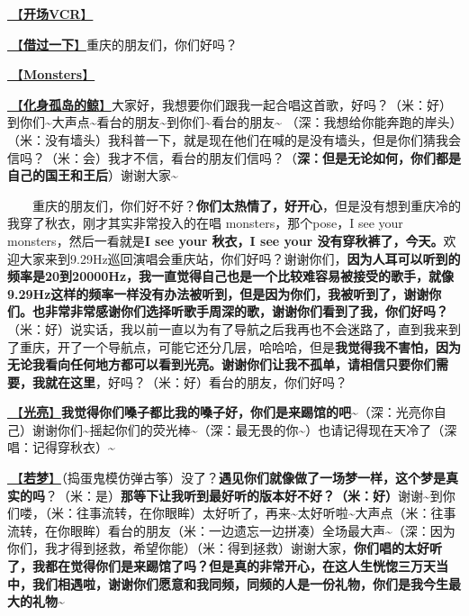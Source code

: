 \documentclass[]{ctexbook}
\begin{document}
\hyperref[opening-vcr]{🎥【\textbf{开场VCR}】}

\hyperref[I-will-go-my-way]{🎵【\textbf{借过一下}】}重庆的朋友们，你们好吗？

\hyperref[Monsters]{🎵【\textbf{Monsters}】}

\hyperref[hua-shen-gu-dao-de-jing]{🎵【\textbf{化身孤岛的鲸}】}大家好，我想要你们跟我一起合唱这首歌，好吗？（米：好）到你们\textasciitilde 大声点\textasciitilde 看台的朋友\textasciitilde 到你们\textasciitilde 看台的朋友\textasciitilde{}
（深：我想给你能奔跑的岸头）（米：没有墙头）我科普一下，就是现在他们在喊的是没有墙头，但是你们猜我会信吗？（米：会）我才不信，看台的朋友们信吗？（\textbf{深：但是无论如何，你们都是自己的国王和王后}）谢谢大家\textasciitilde{}

  重庆的朋友们，你们好不好？\textbf{你们太热情了，好开心}，但是没有想到重庆冷的我穿了秋衣，刚才其实非常投入的在唱 monsters，那个pose，I see your monsters，然后一看就是\textbf{I see your 秋衣，I see your 没有穿秋裤了，今天。}欢迎大家来到9.29Hz巡回演唱会重庆站，你们好吗？谢谢你们，\textbf{因为人耳可以听到的频率是20到20000Hz，我一直觉得自己也是一个比较难容易被接受的歌手，就像9.29Hz这样的频率一样没有办法被听到，但是因为你们，我被听到了，谢谢你们。也非常非常感谢你们选择听歌手周深的歌，谢谢你们看到了我，你们好吗？}（米：好）说实话，我以前一直以为有了导航之后我再也不会迷路了，直到我来到了重庆，开了一个导航点，可能它还分几层，哈哈哈，但是\textbf{我觉得我不害怕，因为无论我看向任何地方都可以看到光亮。谢谢你们让我不孤单，请相信只要你们需要，我就在这里}，好吗？（米：好）看台的朋友，你们好吗？

\hyperref[silver-linings]{🎵【\textbf{光亮}】}\textbf{我觉得你们嗓子都比我的嗓子好，你们是来踢馆的吧}\textasciitilde（深：光亮你自己）谢谢你们\textasciitilde 摇起你们的荧光棒\textasciitilde（深：最无畏的你\textasciitilde）也请记得现在天冷了（深唱：记得穿秋衣）\textasciitilde{}

\hyperref[ruomeng]{🎵【\textbf{若梦}】}（捣蛋鬼模仿弹古筝）没了？\textbf{遇见你们就像做了一场梦一样，这个梦是真实的吗}？（米：是）\textbf{那等下让我听到最好听的版本好不好？（米：好）}谢谢\textasciitilde 到你们喽，（米：往事流转，在你眼眸）太好听了，再来\textasciitilde 太好听啦\textasciitilde 大声点（米：往事流转，在你眼眸）看台的朋友（米：一边遗忘一边拼凑）全场最大声\textasciitilde（深：因为你们，我才得到拯救，希望你能）（米：得到拯救）谢谢大家，\textbf{你们唱的太好听了，我都在觉得你们是来踢馆了吗？但是真的非常开心，在这人生恍惚三万天当中，我们相遇啦，谢谢你们愿意和我同频，同频的人是一份礼物，你们是我今生最大的礼物\textasciitilde{}}
\end{document}
